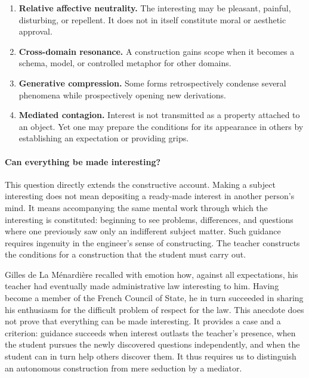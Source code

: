 \documentclass[11pt,a4paper]{article}
\begin{document}
\begin{enumerate}[resume]
  \item \textbf{Relative affective neutrality.} The interesting may be
        pleasant, painful, disturbing, or repellent. It does not in itself
        constitute moral or aesthetic approval.
  \item \textbf{Cross-domain resonance.} A construction gains scope when it
        becomes a schema, model, or controlled metaphor for other domains.
  \item \textbf{Generative compression.} Some forms retrospectively condense
        several phenomena while prospectively opening new derivations.
  \item \textbf{Mediated contagion.} Interest is not transmitted as a property
        attached to an object. Yet one may prepare the conditions for its
        appearance in others by establishing an expectation or providing
        grips.
\end{enumerate}

\paragraph{Can everything be made interesting?}

This question directly extends the constructive account. Making a subject
interesting does not mean depositing a ready-made interest in another person's
mind. It means accompanying the same mental work through which the interesting
is constituted: beginning to see problems, differences, and questions where
one previously saw only an indifferent subject matter. Such guidance requires
ingenuity in the engineer's sense of constructing. The teacher constructs the
conditions for a construction that the student must carry out.

Gilles de La Ménardière recalled with emotion how, against all expectations,
his teacher had eventually made administrative law interesting to him. Having
become a member of the French Council of State, he in turn succeeded in sharing
his enthusiasm for the difficult problem of respect for the law. This anecdote
does not prove that everything can be made interesting. It provides a case and
a criterion: guidance succeeds when interest outlasts the teacher's presence,
when the student pursues the newly discovered questions independently, and when
the student can in turn help others discover them. It thus requires us to
distinguish an autonomous construction from mere seduction by a mediator.
\end{document}
